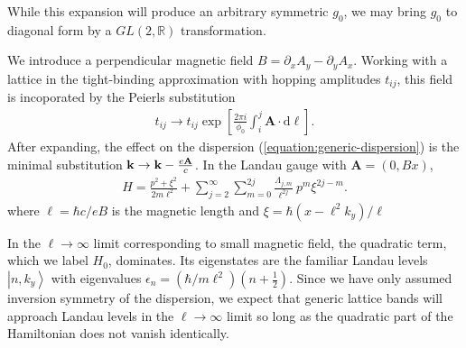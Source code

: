 \documentclass[aps,prb,twocolumn,letterpaper,twoside,nobalancelastpage,groupedaddress,amsmath,amssymb,floatfix,citeautoscript]{revtex4-1}
\begin{document}
While this expansion will produce an arbitrary symmetric $g_0$, we may bring $g_0$ to diagonal form by a $GL(2,\mathbb{R})$ transformation.

We introduce a perpendicular magnetic field $B = \partial_x A_y - \partial_y A_x$. Working with a lattice in the tight-binding approximation with hopping amplitudes $t_{ij}$, this field is incoporated by the Peierls substitution
\begin{align*}
t_{ij} \rightarrow t_{ij}\exp\left[\frac{2\pi i}{\phi_0}\int_{i}^{j}\mathbf{A}\cdot\text{d}\boldsymbol{\ell}\right].
\end{align*}
After expanding, the effect on the dispersion (\ref{equation:generic-dispersion}) is the minimal substitution ${\bf k} \rightarrow {\bf k} - \frac{e\mathbf{A}}{c}$. In the Landau gauge with $\mathbf{A} = (0,B x)$, 
\begin{align*}
H = \frac{p^2 + \xi^2}{2m\ell^2} + \sum_{j=2}^{\infty}\sum_{m=0}^{2j} \frac{\Lambda_{j,m}}{\ell^{2j}}~ p^m \xi^{2j-m}.
\end{align*}
where $\ell = \hbar c / e B$ is the magnetic length and $\xi = \hbar(x - \ell^2 k_y)/\ell$


In the $\ell \rightarrow \infty$ limit corresponding to small magnetic field, the quadratic term, which we label $H_0$, dominates. Its eigenstates are the familiar Landau levels $\left|n,k_y\right>$ with eigenvalues $\epsilon_n = (\hbar/m \ell^2)\left(n + \frac{1}{2}\right)$. Since we have only assumed inversion symmetry of the dispersion, we expect that generic lattice bands will approach Landau levels in the $\ell\rightarrow \infty$  limit so long as the quadratic part of the Hamiltonian does not vanish identically.
\end{document}
